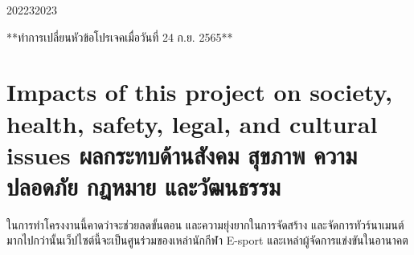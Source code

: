 \begin{plan}{9}{2022}{3}{2023}
\end{plan}
\begin{center}
    **ทำการเปลี่ยนหัวข้อโปรเจคเมื่อวันที่ 24 ก.ย. 2565**
\end{center}


\section{\ifenglish%
Impacts of this project on society, health, safety, legal, and cultural issues
\else%
ผลกระทบด้านสังคม สุขภาพ ความปลอดภัย กฎหมาย และวัฒนธรรม
\fi}

ในการทำโครงงานนี้คาดว่าจะช่วยลดขั้นตอน และความยุ่งยากในการจัดสร้าง และจัดการทัวร์นาเมนต์
มากไปกว่านั้นเว็ปไซต์นี้จะเป็นศูนร่วมของเหล่านักกีฬา E-sport และเหล่าผู้จัดการแข่งขันในอานาคต
